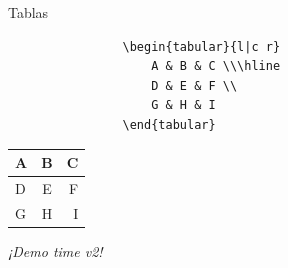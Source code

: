 \begin{frame}[fragile]{Tablas}

    \begin{center}
        
        \vspace{-1cm}\hspace{1cm}\begin{verbatim}
                \begin{tabular}{l|c r}
                    A & B & C \\\hline
                    D & E & F \\
                    G & H & I 
                \end{tabular}
        \end{verbatim}
    
        \vspace{1.5cm}
        
        \begin{tabular}{l|c r}
            A & B & C \\\hline
            D & E & F \\
            G & H & I 
        \end{tabular}

        \vspace{1cm}

        \textit{¡Demo time v2!}

    \end{center}

\end{frame}